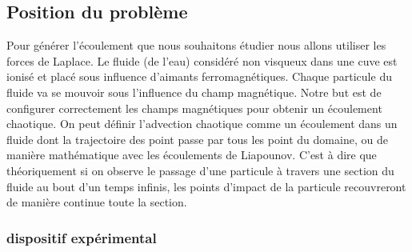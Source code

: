 \documentclass[a4paper,12pt,titlepage]{report}
\begin{document}
\begin{onehalfspace}

\chapter{Position du problème}

Pour générer l'écoulement que nous souhaitons étudier nous allons utiliser les forces de Laplace. Le fluide (de l'eau) considéré non visqueux dans une cuve est ionisé et placé sous influence d'aimants ferromagnétiques. Chaque particule du fluide va se mouvoir sous l'influence du champ magnétique. Notre but est de configurer correctement les champs magnétiques pour obtenir un écoulement chaotique. On peut définir l'advection chaotique comme un écoulement dans un fluide dont la trajectoire des point passe par tous les point du domaine, ou de manière mathématique avec les écoulements de Liapounov.
C'est à dire que théoriquement si on observe le passage d'une particule à travers une section du fluide au bout d'un temps infinis, les points d'impact de la particule recouvreront de manière continue toute la section.

\subsection{dispositif expérimental} 


\end{onehalfspace}
\end{document}
